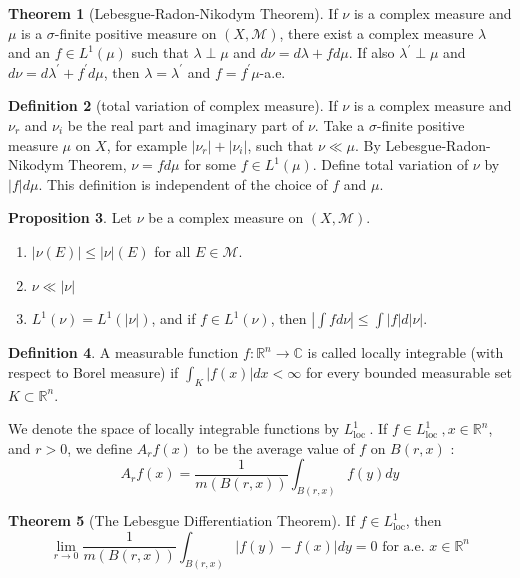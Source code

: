 \documentclass[12pt,a4paper]{book}
\newcommand{\bb}[1]{\mathbb{#1}}
\newenvironment{enu}{\begin{enumerate}[(1)]}{\end{enumerate}}
\theoremstyle{definition}
\newtheorem{defn}{Definition}[section]
\newtheorem{theo}[defn]{Theorem}
\newtheorem{prop}[defn]{Proposition}
\begin{document}
\begin{theo}[Lebesgue-Radon-Nikodym Theorem]
    If $\nu$ is a complex measure and $\mu$ is
    a $\sigma$-finite positive measure on
    $(X, \mathcal{M})$, there exist a complex measure $\lambda$
    and an $f \in L^1(\mu)$ such that $\lambda \perp \mu$ and
    $d \nu=d \lambda+f d \mu$. If also $\lambda^{\prime} \perp \mu$ and $d \nu=d \lambda^{\prime}+f^{\prime} d \mu$, then $\lambda=\lambda^{\prime}$ and $f=f^{\prime} \mu$-a.e.
\end{theo}
\begin{defn}[total variation of complex measure]
    If $\nu$ is a complex measure and $\nu_r$ and $\nu_i$
    be the real part and imaginary part of $\nu$. Take a $\sigma$-finite
    positive measure $\mu$ on $X$, for example $|\nu_r|+|\nu_i|$, such that $\nu \ll \mu$. By Lebesgue-Radon-Nikodym Theorem,
    $\nu=fd \mu$ for some $f\in L^1(\mu)$. Define total variation of $\nu$ by $|f|d\mu$.
    This definition is independent of the choice of
    $f$ and $\mu$.
\end{defn}
\begin{prop}
    Let $\nu$ be a complex measure on $(X, \mathcal{M})$.
    \begin{enu}
        \item  $|\nu(E)| \leq|\nu|(E)$ for all $E \in \mathcal{M}$.
        \item  $\nu \ll|\nu|$
        \item  $L^1(\nu)=L^1(|\nu|)$, and if $f \in L^1(\nu)$, then $\left|\int f d \nu\right| \leq \int|f| d|\nu|$.
    \end{enu}
\end{prop}
\begin{defn}
    A measurable function $f: \mathbb{R}^n \rightarrow \mathbb{C}$ is called locally integrable (with respect to 
    Borel measure) if $\int_K|f(x)| d x<\infty$ for every bounded measurable set $K \subset \mathbb{R}^n$.

    We denote the space of locally integrable functions by $L_{\text {loc }}^1$. If $f \in L_{\text {loc }}^1, x \in \mathbb{R}^n$, and $r>0$, we define $A_r f(x)$ to be the average value of $f$ on $B(r, x)$ :
    $$
        A_r f(x)=\frac{1}{m(B(r, x))} \int_{B(r, x)} f(y) d y
    $$
\end{defn}
\begin{theo}[The Lebesgue Differentiation Theorem]
    If $f \in L_{\mathrm{loc}}^1$, then 
    $$
    \lim _{r \rightarrow 0} \frac{1}{m(B(r, x))} \int_{B(r, x)}|f(y)-f(x)| d y=0 \text{ for a.e. } x\in \bb{R}^n
    $$
\end{theo}
\end{document}
